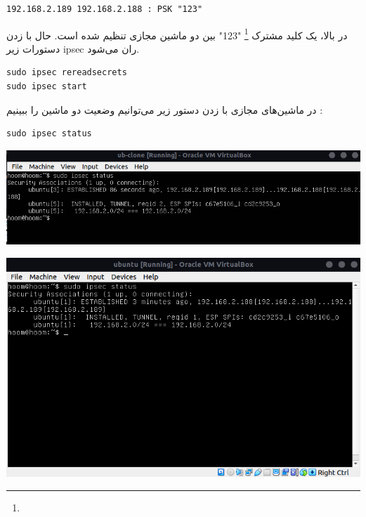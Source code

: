 \begin{enumerate}[label=\alph*)]
\begin{latin}
\begin{lstlisting}
192.168.2.189 192.168.2.188 : PSK "123"
\end{lstlisting}
\end{latin}
در بالا، یک کلید مشترک 
\footnote{}
"123"
بین دو ماشین مجازی تنظیم شده است.
حال با زدن دستورات زیر ipsec ران می‌شود.
\begin{latin}
\begin{lstlisting}
sudo ipsec rereadsecrets
sudo ipsec start
\end{lstlisting}
\end{latin}
در ماشین‌های مجازی با زدن دستور زیر می‌توانیم وضعیت دو ماشین را ببینیم : 
\begin{latin}
\begin{lstlisting}
sudo ipsec status
\end{lstlisting}
  \end{latin}
  \begin{center}
    \includegraphics[scale=0.5]{pics/ipsec1.png}
  \end{center}
  \begin{center}
    \includegraphics[scale=0.5]{pics/ipsec2.png}
  \end{center}
\end{enumerate}
